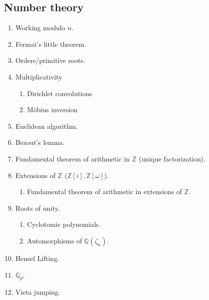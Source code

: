 \documentclass{article}
\begin{document}
\subsection*{Number theory}
\begin{enumerate}
\item[\underline{\hspace{0.4cm}}] Working modulo $n$.
\item[\underline{\hspace{0.4cm}}] Fermat's little theorem.
\item[\underline{\hspace{0.4cm}}] Orders/primitive roots.
\item[\underline{\hspace{0.4cm}}] Multiplicativity
\begin{enumerate}
\item[\underline{\hspace{0.4cm}}] Dirichlet convolutions
\item[\underline{\hspace{0.4cm}}] M\"{o}bius inversion
\end{enumerate}
\item[\underline{\hspace{0.4cm}}] Euclidean algorithm.
\item[\underline{\hspace{0.4cm}}] Bezout's lemma.
\item[\underline{\hspace{0.4cm}}] Fundamental theorem of arithmetic in $\mathbb{Z}$ (unique factorization).
\item[\underline{\hspace{0.4cm}}] Extensions of $\mathbb{Z}$ ($\mathbb{Z}[i], \mathbb{Z}[\omega]$).
\begin{enumerate}
\item[\underline{\hspace{0.4cm}}] Fundamental theorem of arithmetic in extensions of $\mathbb{Z}$.
\end{enumerate}
\item[\underline{\hspace{0.4cm}}] Roots of unity.
\begin{enumerate}
\item[\underline{\hspace{0.4cm}}] Cyclotomic polynomials.
\item[\underline{\hspace{0.4cm}}] Automorphisms of $\mathbb{Q}(\zeta_n)$.
\end{enumerate}
\item[\underline{\hspace{0.4cm}}] Hensel Lifting.
\item[\underline{\hspace{0.4cm}}] $\mathbb{Q}_p$.
\item[\underline{\hspace{0.4cm}}] Vieta jumping.
\end{enumerate}
\end{document}
